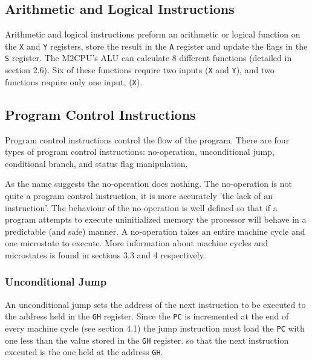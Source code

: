\documentclass[a4paper,12pt]{article}
\newcommand{\mt}{M2CPU}
\newcommand{\Ar}{\texttt{A}}
\newcommand{\Gr}{\texttt{G}}
\newcommand{\Hr}{\texttt{H}}
\newcommand{\Xr}{\texttt{X}}
\newcommand{\Yr}{\texttt{Y}}
\newcommand{\Sr}{\texttt{S}}
\newcommand{\PC}{\texttt{PC}}
\begin{document}
\subsection{Arithmetic and Logical Instructions}
Arithmetic and logical instructions preform an arithmetic or logical function
on the \Xr{} and \Yr{} registers, store the result in the \Ar{} register and 
update the flags in the \Sr{} register. The \mt{}'s ALU can calculate 8 
different functions (detailed in section 2.6). Six of these functions require
two inputs (\Xr{} and \Yr{}), and two functions require only one input, (\Xr{}).
\par

\subsection{Program Control Instructions}
Program control instructions control the flow of the program. There are four
types of program control instructions: no-operation, unconditional jump,
conditional branch, and status flag manipulation.
\par

As the name suggests the no-operation does nothing. The no-operation is not 
quite a program control instruction, it is more accurately 'the lack of an 
instruction'. The behaviour of the no-operation is well defined so that if a 
program attempts to execute uninitialized memory the processor will behave in a 
predictable (and safe) manner. A no-operation takes an entire machine cycle and
one microstate to execute. More information about machine cycles and 
microstates is found in sections 3.3 and 4 respectively.
\par

\subsubsection{Unconditional Jump}
An unconditional jump sets the address of the next instruction to be executed
to the address held in the \Gr{}\Hr{} register. Since the \PC{} is incremented
at the end of every machine cycle (see section 4.1) the jump instruction must
load the \PC{} with one less than the value stored in the \Gr{}\Hr{} register.
so that the next instruction executed is the one held at the address 
\Gr{}\Hr{}.
\par
\end{document}
